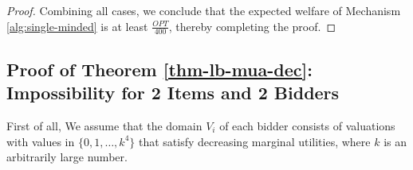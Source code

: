 \begin{proof}

Combining all cases, we conclude that the expected welfare of Mechanism \ref{alg:single-minded} is at least $\frac{OPT}{400}$,  thereby completing the proof.
\end{proof}





\subsection{ Proof of  Theorem \ref{thm-lb-mua-dec}: Impossibility for 2 Items and 2 Bidders} \label{subsec-lb-proof-mua-dec}
First of all, We assume that the domain $V_i$ of each bidder consists of valuations with values in  $\{0,1,\ldots,k^4\}$ that satisfy decreasing marginal utilities, where $k$ is an arbitrarily large number. 

